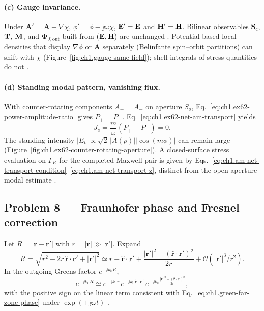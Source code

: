 \paragraph{(c) Gauge invariance.}
Under $\mathbf{A}'=\mathbf{A}+\nabla\chi$, $\phi'=\phi-\jj\omega\chi$, $\mathbf{E}'=\mathbf{E}$ and $\mathbf{H}'=\mathbf{H}$. Bilinear observables $\mathbf{S}_\mathrm{c}$, $\mathbf{T}$, $\mathbf{M}$, and $\boldsymbol{\Phi}_{J,\mathrm{out}}$ built from $(\mathbf{E},\mathbf{H})$ are unchanged \cite{belinfante1940,jackson1999}. Potential-based local densities that display $\nabla\phi$ or $\mathbf{A}$ separately (Belinfante spin--orbit partitions) can shift with $\chi$ (Figure~\ref{fig:ch1.gauge-same-field}); shell integrals of stress quantities do not \cite{belinfante1940,stratton1941}.

\paragraph{(d) Standing modal pattern, vanishing flux.}
With counter-rotating components $A_+=A_-$ on aperture $S_o$, Eq.~\eqref{eq:ch1.ex62-power-amplitude-ratio} gives $P_+=P_-$. Eq.~\eqref{eq:ch1.ex62-net-am-transport} yields
\[
\dot J_z=\frac{m}{\omega}(P_+-P_-)=0.
\]
The standing intensity $|E_t|\propto\sqrt{2}\,|A(\rho)||\cos(m\phi)|$ can remain large (Figure~\ref{fig:ch1.ex62-counter-rotating-aperture}). A closed-surface stress evaluation on $\Gamma_R$ for the completed Maxwell pair is given by Eqs.~\eqref{eq:ch1.am-net-transport-condition}--\eqref{eq:ch1.am-net-transport-z}, distinct from the open-aperture modal estimate \cite{allen1992,beth1936,stratton1941}.

\subsection*{Problem 8 --- Fraunhofer phase and Fresnel correction}

Let $R=|\mathbf{r}-\mathbf{r}'|$ with $r=|\mathbf{r}|\gg|\mathbf{r}'|$. Expand
\[
R=\sqrt{r^2-2r\,\hat{\mathbf{r}}\cdot\mathbf{r}'+|\mathbf{r}'|^2}
\simeq r-\hat{\mathbf{r}}\cdot\mathbf{r}'+\frac{|\mathbf{r}'|^2-(\hat{\mathbf{r}}\cdot\mathbf{r}')^2}{2r}+\mathcal{O}(|\mathbf{r}'|^3/r^2).
\]
In the outgoing Greens factor $e^{-\jj k_0 R}$,
\[
e^{-\jj k_0 R}
\simeq e^{-\jj k_0 r}\,
e^{+\jj k_0\hat{\mathbf{r}}\cdot\mathbf{r}'}\,
e^{-\jj k_0\frac{|\mathbf{r}'|^2-(\hat{\mathbf{r}}\cdot\mathbf{r}')^2}{2r}},
\]
with the positive sign on the linear term consistent with Eq.~\eqref{eq:ch1.green-far-zone-phase} under $\exp(+\jj\omega t)$ \cite{stratton1941,silver1949}.

